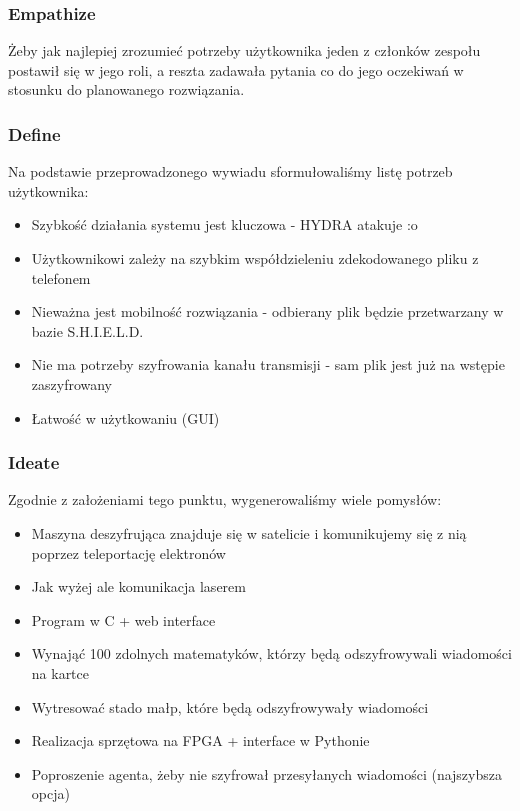 \documentclass{article}
\begin{document}
\subsubsection{Empathize}
\label{sec:empathize}

Żeby jak najlepiej zrozumieć potrzeby użytkownika jeden z członków zespołu
postawił się w jego roli, a reszta zadawała pytania 
co do jego oczekiwań w stosunku do planowanego rozwiązania. 

\subsubsection{Define}
\label{sec:define}

Na podstawie przeprowadzonego wywiadu sformułowaliśmy listę potrzeb użytkownika:

\begin{itemize}
    \item Szybkość działania systemu jest kluczowa - HYDRA atakuje :o
    \item Użytkownikowi zależy na szybkim współdzieleniu zdekodowanego pliku z telefonem
    \item Nieważna jest mobilność rozwiązania - odbierany plik będzie przetwarzany w bazie S.H.I.E.L.D.
    \item Nie ma potrzeby szyfrowania kanału transmisji - sam plik jest już na wstępie zaszyfrowany
    \item Łatwość w użytkowaniu (GUI)
\end{itemize}

\subsubsection{Ideate}
\label{sec:ideate}

Zgodnie z założeniami tego punktu, wygenerowaliśmy wiele pomysłów:

\begin{itemize}
    \item Maszyna deszyfrująca znajduje się w satelicie i komunikujemy się z nią poprzez teleportację elektronów
    \item Jak wyżej ale komunikacja laserem
    \item Program w C + web interface
    \item Wynająć 100 zdolnych matematyków, którzy będą odszyfrowywali wiadomości na kartce
    \item Wytresować stado małp, które będą odszyfrowywały wiadomości
    \item Realizacja sprzętowa na FPGA + interface w Pythonie
    \item Poproszenie agenta, żeby nie szyfrował przesyłanych wiadomości (najszybsza opcja)
\end{itemize}
\end{document}
